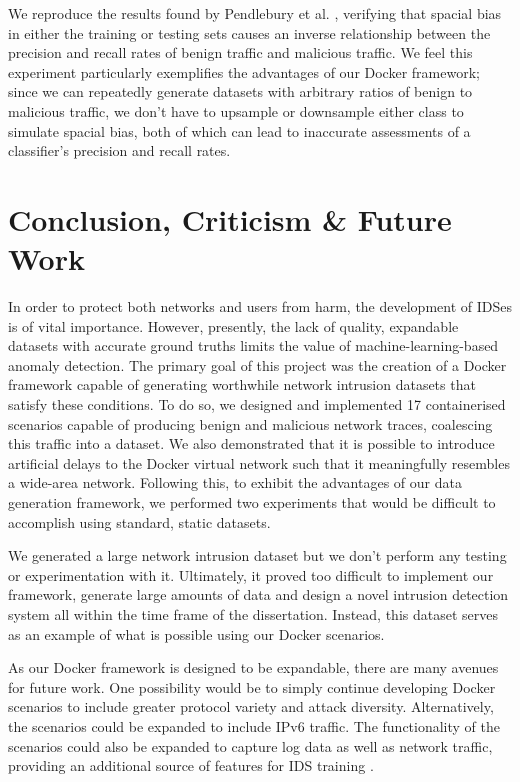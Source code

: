 \documentclass[msc,deptreport, cs]{infthesis} %
\begin{document}
We reproduce the results found by Pendlebury et al. \cite{pendlebury2019tesseract}, verifying that spacial bias in either the training or testing sets causes an inverse relationship between the precision and recall rates of benign traffic and malicious traffic. We feel this experiment particularly exemplifies the advantages of our Docker framework; since we can repeatedly generate  datasets with arbitrary ratios of benign to malicious traffic, we don't have to upsample or downsample either class to simulate spacial bias, both of which can lead to inaccurate assessments of a classifier's precision and recall rates. 

\section{Conclusion, Criticism \& Future Work}


In order to protect both networks and users from harm, the development of IDSes is of vital importance. However, presently, the lack of quality, expandable datasets with accurate ground truths limits the value of machine-learning-based anomaly detection. The primary goal of this project was the creation of a Docker framework capable of generating worthwhile network intrusion datasets that satisfy these conditions. To do so, we designed and implemented 17 containerised scenarios capable of producing benign and malicious network traces, coalescing this traffic into a dataset. We also demonstrated that it is possible to introduce artificial delays to the Docker virtual network such that it meaningfully resembles a wide-area network. Following this, to exhibit the advantages of our data generation framework, we performed two experiments that would be difficult to accomplish using standard, static datasets.

We generated a large network intrusion dataset but we don't perform any testing or experimentation with it. Ultimately, it proved too difficult to implement our framework, generate large amounts of data and design a novel intrusion detection system all within the time frame of the dissertation. Instead, this dataset serves as an example of what is possible using our Docker scenarios.

As our Docker framework is designed to be expandable, there are many avenues for future work. One  possibility would be to simply continue developing Docker scenarios to include greater protocol variety and attack diversity. Alternatively, the scenarios could be expanded to include IPv6 traffic. The functionality of the scenarios could also be expanded to capture log data as well as network traffic, providing an additional source of features for IDS training \cite{abad2003log}.
\end{document}
